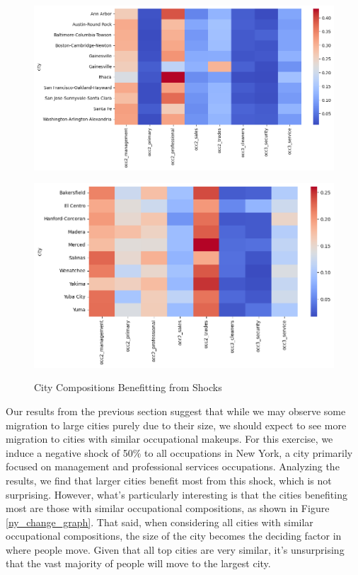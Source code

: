\documentclass[10pt]{article}
\begin{document}
\begin{figure}[!htb]
    \centering
    \caption{City Compositions Benefitting from Shocks}
    \begin{minipage}{0.48\textwidth}
        \centering
        \includegraphics[width=\textwidth]{../../estimations/graphs/ny_counter.png}
        \label{ny_change_graph}
    \end{minipage}\hfill
    \begin{minipage}{0.48\textwidth}
        \centering
        \includegraphics[width=\textwidth]{../../estimations/graphs/vp_counter.png}
        \label{vp_change_graph}
    \end{minipage}
\end{figure}

Our results from the previous section suggest that while we may observe some migration to large cities purely due to their size, we should expect to see more migration to cities with similar occupational makeups. For this exercise, we induce a negative shock of 50\% to all occupations in New York, a city primarily focused on management and professional services occupations. Analyzing the results, we find that larger cities benefit most from this shock, which is not surprising. However, what's particularly interesting is that the cities benefiting most are those with similar occupational compositions, as shown in Figure \ref{ny_change_graph}. That said, when considering all cities with similar occupational compositions, the size of the city becomes the deciding factor in where people move. Given that all top cities are very similar, it's unsurprising that the vast majority of people will move to the largest city.
\end{document}
